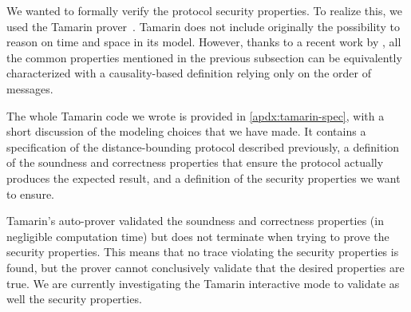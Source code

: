 We wanted to formally verify the protocol security properties. To realize this, 
we used the Tamarin prover~\cite{meier2013tamarin}. Tamarin does not include 
originally the possibility to reason on time and space in its model.
However, thanks to a recent work by \textcite{TamarinDB}, all the common 
properties mentioned in the previous subsection can be equivalently 
characterized with a causality-based definition relying only on the order of 
messages.

The whole Tamarin code we wrote is provided in \cref{apdx:tamarin-spec}, with a short discussion of the modeling choices that we have made. 
It contains a specification of the distance-bounding protocol described previously, a definition of the soundness and correctness properties that ensure the protocol actually produces the expected result, and a definition of the security properties we want to ensure.

Tamarin's auto-prover validated the soundness and correctness properties (in negligible computation time) but does not terminate when trying to prove the security properties.
This means that no trace violating the security properties is found, but the prover cannot conclusively validate that the desired properties are true. 
We are currently investigating the Tamarin interactive mode to validate as well the security properties.


